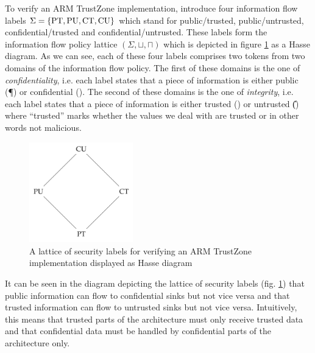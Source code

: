 \begin{example}
    To verify an ARM TrustZone implementation, \citeauthor{Ferraiuolo17} introduce four information flow labels $ \Sigma = \{ \text{PT}, \text{PU}, \text{CT}, \text{CU} \} $ which stand for public/trusted, public/untrusted, confidential/trusted and confidential/untrusted.
    These labels form the information flow policy lattice $ (\Sigma, \sqcup, \sqcap) $ which is depicted in figure \ref{fig:sec-lattice} as a Hasse diagram.
    As we can see, each of these four labels comprises two tokens from two domains of the information flow policy.
    The first of these domains is the one of \textit{confidentiality}, i.e. each label states that a piece of information is either public (\P{}) or confidential (\C{}).
    The second of these domains is the one of \textit{integrity}, i.e. each label states that a piece of information is either trusted (\T{}) or untrusted (\U{}) where \enquote{trusted} marks whether
    the values we deal with are trusted or in other words not malicious.

    \begin{figure}
        \centering
        \includegraphics[width=0.4\textwidth]{figures/ifp-lattice.png}
        \caption{A lattice of security labels for verifying an ARM TrustZone implementation displayed as Hasse diagram \cite{Ferraiuolo17}}
        \label{fig:sec-lattice}
    \end{figure}

    It can be seen in the diagram depicting the lattice of security labels (fig. \ref{fig:sec-lattice}) that public information can flow to confidential sinks but not vice versa and that trusted information can flow to untrusted sinks but not vice versa.
    Intuitively, this means that trusted parts of the architecture must only receive trusted data and that confidential data must be handled by confidential parts of the architecture only.
\end{example}


